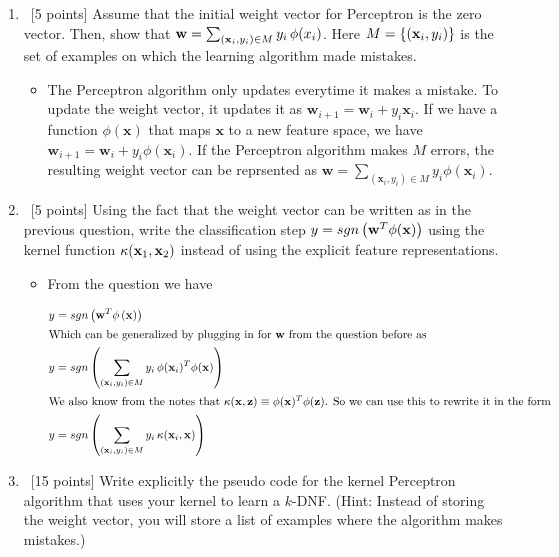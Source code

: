 \begin{enumerate}
\item ~[5 points] Assume that the initial weight vector for Perceptron
  is the zero vector. Then, show that
  ${\bf w} = \sum_{({\bf x}_i, y_i) \in M} y_i \, \phi(x_i)$. Here
  $M = \{({\bf x}_i, y_i)\}$ is the set of examples on which the learning
  algorithm made mistakes.

\begin{itemize}
\item The Perceptron algorithm only updates everytime it makes a mistake. To update the weight vector, it updates it as $\mathbf{w}_{i+1} = \mathbf{w}_{i} + y_{i}\mathbf{x}_{i}$. If we have a function $\phi(\mathbf{x})$ that maps $\mathbf{x}$ to a new feature space, we have $\mathbf{w}_{i+1} = \mathbf{w}_{i} + y_{i}\phi(\mathbf{x}_{i})$. If the Perceptron algorithm makes $M$ errors, the resulting weight vector can be reprsented as $\mathbf{w} = \sum_{(\mathbf{x}_{i},y_{i})\in M} y_{i}\phi(\mathbf{x}_{i})$.
\end{itemize} 

\item ~[5 points] Using the fact that the weight vector can be written
  as in the previous question, write the classification step
  $y=sgn\left({\bf w}^T\phi({\bf x})\right)$ using the kernel function
  $\kappa({\bf x}_1,{\bf x}_2)$ instead of using the explicit feature
  representations.

\begin{itemize}
\item From the question we have

\begin{align*}
y &= sgn\left( \mathbf{w}^{T}\phi\left(\mathbf{x} \right)\right)\\
\intertext{Which can be generalized by plugging in for $\mathbf{w}$ from the question before as}
y &= sgn\left( \sum_{({\bf x}_i, y_i) \in M} y_i \, \phi(\mathbf{x}_i)^{T}\phi(\mathbf{x})\right)\\
\intertext{We also know from the notes that $\kappa(\mathbf{x},\mathbf{z}) \equiv \phi(\mathbf{x})^{T}\phi(\mathbf{z})$. So we can use this to rewrite it in the form}
y &= sgn\left(\sum_{({\bf x}_i, y_i) \in M} y_i \, \kappa(\mathbf{x}_{i},\mathbf{x}) \right)
\end{align*}
\end{itemize} 

\item ~[15 points] Write explicitly the pseudo code for the kernel
  Perceptron algorithm that uses your kernel to learn a $k$-DNF.
  (Hint: Instead of storing the weight vector, you will store a list
  of examples where the algorithm makes mistakes.)


\end{enumerate}
